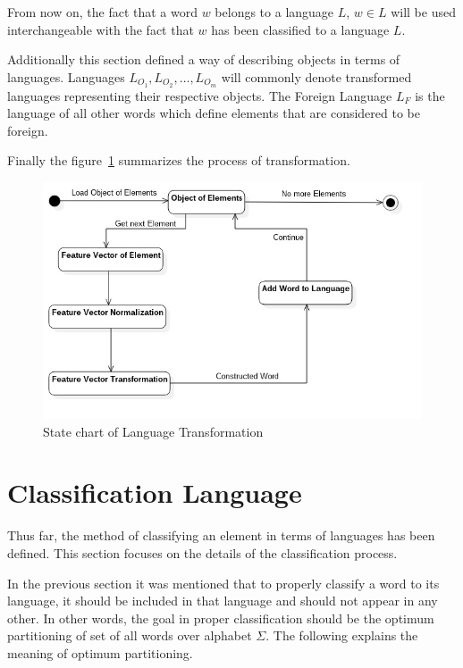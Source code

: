 \documentclass{mini}
\begin{document}
From now on, the fact that a word $w$ belongs to a language $L$, $w\in L$ will be used interchangeable with the fact that $w$ has been classified to a language $L$.

Additionally this section defined a way of describing objects in terms of languages. Languages $L_{O_1},L_{O_2},\ldots,L_{O_m}$ will commonly denote transformed languages representing their respective objects. The Foreign Language $L_{F}$ is the language of all other words which define elements that are considered to be foreign.

Finally the figure~\ref{fig:transf_state} summarizes the process of transformation.

\begin{figure}[H]
    \centering
    \includegraphics[width=1.0\textwidth]{../uml/states/word_transformation.jpg}
    \caption{State chart of Language Transformation}
    \label{fig:transf_state}
\end{figure}

\section{Classification Language}\label{sec:lan_theory_class_lan}
Thus far, the method of classifying an element in terms of languages has been defined. This section focuses on the details of the classification process.

In the previous section it was mentioned that to properly classify a word to its language, it should be included in that language and should not appear in any other. In other words, the goal in proper classification should be the optimum partitioning of set of all words over alphabet $\Sigma$. The following explains the meaning of optimum partitioning.
\end{document}
